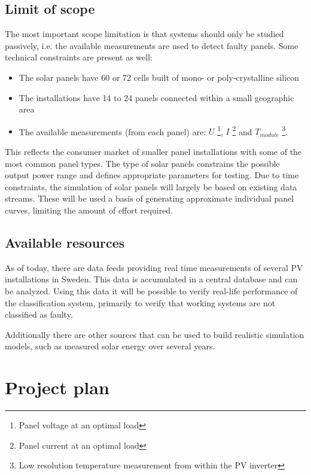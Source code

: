 \documentclass[a4paper,11pt]{article}
\begin{document}
\subsection*{Limit of scope}
The most important scope limitation is that systems should only be studied passively, i.e. the available measurements are used to detect faulty panels.  
Some technical constraints are present as well:
\begin{itemize}
\item The solar panels have 60 or 72 cells built of mono- or poly-crystalline silicon

\item The installations have 14 to 24 panels connected within a small geographic area

\item The available measurements (from each panel) are:
$U$ \footnote{Panel voltage at an optimal load},
$I$ \footnote{Panel current at an optimal load} and
$T_{module}$ \footnote{Low resolution temperature measurement from within the PV inverter}.

\end{itemize}

This reflects the consumer market of smaller panel installations with some of the most common panel types.
The type of solar panels constrains the possible output power range and defines appropriate parameters for testing.
Due to time constraints, the simulation of solar panels will largely be based on existing data streams.
These will be used a basis of generating approximate individual panel curves, limiting the amount of effort required.

\subsection*{Available resources}
As of today, there are data feeds providing real time measurements of several PV installations in Sweden.
This data is accumulated in a central database and can be analyzed.
Using this data it will be possible to verify real-life performance of the classification system, primarily to verify that working systems are not classified as faulty.

Additionally there are other sources that can be used to build realistic simulation models, such as measured solar energy over several years.

\section*{Project plan}
\end{document}
